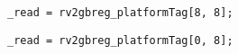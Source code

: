 \implementation{}
\begin{lstlisting}
_read = rv2gbreg_platformTag[8, 8];
\end{lstlisting}

\implementation{}
\begin{lstlisting}
_read = rv2gbreg_platformTag[0, 8];
\end{lstlisting}

